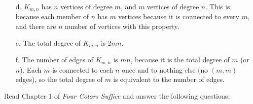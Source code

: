 \documentclass{article}
\begin{document}
\begin{itemize}
    \item [d.] $K_{m,n}$ has $n$ vertices of degree $m$, and $m$ vertices of degree $n$. This is because each member of $n$ has $m$ vertices because it is connected to every $m$, and there are $n$ number of vertices with this property.
    \item [e.] The total degree of $K_{m,n}$ is $2mn$.
    \item [f.] The number of edges of $K_{m,n}$ is $mn$, because it is the total degree of $m$ (or $n$). Each $m$ is connected to each $n$ once and to nothing else (no $(m,m)$ edges), so the total degree of $m$ is equivalent to the number of edges.
\end{itemize}


\collab{\todo{}}

Read Chapter 1 of \emph{Four Colors Suffice} and answer the following questions:
\end{document}
